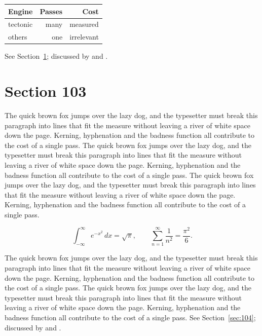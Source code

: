 \documentclass{article}
\begin{document}
\begin{center}
\begin{tabular}{lrr}
\toprule
Engine & Passes & Cost \\
\midrule
tectonic & many & measured \\
others & one & irrelevant \\
\bottomrule
\end{tabular}
\end{center}

See Section~\ref{sec:103}; discussed by \textcite{k3} and \textcite{l5}.
\section{Section 103}
\label{sec:103}
The quick brown fox jumps over the lazy dog, and the typesetter must break this paragraph into lines that fit the measure without leaving a river of white space down the page. Kerning, hyphenation and the badness function all contribute to the cost of a single pass. The quick brown fox jumps over the lazy dog, and the typesetter must break this paragraph into lines that fit the measure without leaving a river of white space down the page. Kerning, hyphenation and the badness function all contribute to the cost of a single pass. The quick brown fox jumps over the lazy dog, and the typesetter must break this paragraph into lines that fit the measure without leaving a river of white space down the page. Kerning, hyphenation and the badness function all contribute to the cost of a single pass. 

\begin{equation}\label{eq:103}
\int_{-\infty}^{\infty} e^{-x^{2}}\,dx = \sqrt{\pi}, \qquad
\sum_{n=1}^{\infty} \frac{1}{n^{2}} = \frac{\pi^{2}}{6}.
\end{equation}

The quick brown fox jumps over the lazy dog, and the typesetter must break this paragraph into lines that fit the measure without leaving a river of white space down the page. Kerning, hyphenation and the badness function all contribute to the cost of a single pass. The quick brown fox jumps over the lazy dog, and the typesetter must break this paragraph into lines that fit the measure without leaving a river of white space down the page. Kerning, hyphenation and the badness function all contribute to the cost of a single pass. 
See Section~\ref{sec:104}; discussed by \textcite{k4} and \textcite{l1}.
\end{document}
